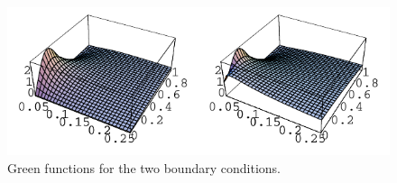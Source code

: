 {\begin{Solution}
  \begin{figure}[h!]
    \begin{center}
      \includegraphics[width=\textwidth]{pde/green/heatzi}
    \end{center}
    \caption{Green functions for the two boundary conditions.}
    \label{heatzi}
  \end{figure}
\end{Solution}












\begin{Solution}
  $\phantom{a}$


\end{Solution}}

